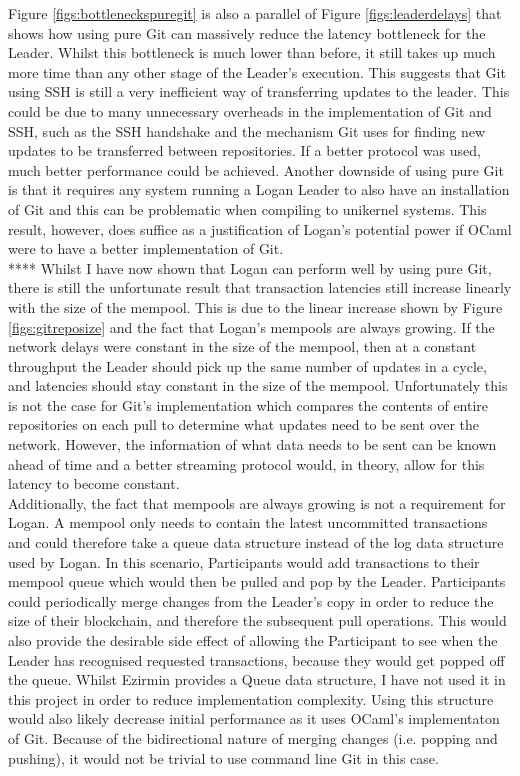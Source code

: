 \documentclass[12pt,a4paper,twoside,openright]{report}
\begin{document}
	Figure \ref{figs:bottleneckspuregit} is also a parallel of Figure \ref{figs:leaderdelays} that shows how using pure Git can massively reduce the latency bottleneck for the Leader.  
	Whilst this bottleneck is much lower than before, it still takes up much more time than any other stage of the Leader's execution.
	This suggests that Git using SSH is still a very inefficient way of transferring updates to the leader.  
	This could be due to many unnecessary overheads in the implementation of Git and SSH, such as the SSH handshake and the mechanism Git uses for finding new updates to be transferred between repositories. 
	If a better protocol was used, much better performance could be achieved. %
	Another downside of using pure Git is that it requires any system running a Logan Leader to also have an installation of Git and this can be problematic when compiling to unikernel systems. 
	This result, however, does suffice as a justification of Logan's potential power if OCaml were to have a better implementation of Git. \\



	****
	Whilst I have now shown that Logan can perform well by using pure Git, there is still the unfortunate result that transaction latencies still increase linearly with the size of the mempool.
	This is due to the linear increase shown by Figure \ref{figs:gitreposize} and the fact that Logan's mempools are always growing. 
	If the network delays were constant in the size of the mempool, then at a constant throughput the Leader should pick up the same number of updates in a cycle, and latencies should stay constant in the size of the mempool.
	Unfortunately this is not the case for Git's implementation which compares the contents of entire repositories on each pull to determine what updates need to be sent over the network. 
	However, the information of what data needs to be sent can be known ahead of time and a better streaming protocol would, in theory, allow for this latency to become constant. \\

	Additionally, the fact that mempools are always growing is not a requirement for Logan.
	A mempool only needs to contain the latest uncommitted transactions and could therefore take a queue data structure instead of the log data structure used by Logan.
	In this scenario, Participants would add transactions to their mempool queue which would then be pulled and pop by the Leader.
	Participants could periodically merge changes from the Leader's copy in order to reduce the size of their blockchain, and therefore the subsequent pull operations.
	This would also provide the desirable side effect of allowing the Participant to see when the Leader has recognised requested transactions, because they would get popped off the queue. 
	Whilst Ezirmin provides a Queue data structure, I have not used it in this project in order to reduce implementation complexity.
	Using this structure would also likely decrease initial performance as it uses OCaml's implementaton of Git.
	Because of the bidirectional nature of merging changes (i.e. popping and pushing), it would not be trivial to use command line Git in this case. \\
\end{document}
